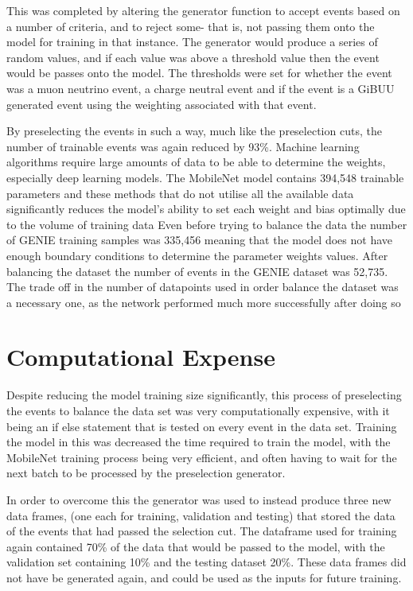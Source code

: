 \noindent This was completed by altering the generator function to accept events based on a number of criteria, and to reject some- that is, not passing them onto the model for training in that instance. The generator would produce a series of random values, and if each value was above a threshold value then the event would be passes onto the model. The thresholds were set for whether the event was a muon neutrino event, a charge neutral event and if the event is a GiBUU generated event using the weighting associated with that event.\medskip

\noindent By preselecting the events in such a way, much like the preselection cuts, the number of trainable events was again reduced by 93\%. Machine learning algorithms require large amounts of data to be able to determine the weights, especially deep learning models. The MobileNet model contains 394,548 trainable parameters and these methods that do not utilise all the available data significantly reduces the model's ability to set each weight and bias optimally due to the volume of training data Even before trying to balance the data the number of GENIE training samples was 335,456 meaning that the model does not have enough boundary conditions to determine the parameter weights values. After balancing the dataset the number of events in the GENIE dataset was 52,735. The trade off in the number of datapoints used in order balance the dataset was a necessary one, as the network performed much more successfully after doing so  \medskip


\section{Computational Expense}

\noindent Despite reducing the model training size significantly, this process of preselecting the events to balance the data set was very computationally expensive, with it being an if else statement that is tested on every event in the data set. Training the model in this was decreased the time required to train the model, with the MobileNet training process being very efficient, and often having to wait for the next batch to be processed by the preselection generator.\medskip

\noindent In order to overcome  this the generator was used to instead produce three new data frames, (one each for training, validation and testing) that stored the data of the events that had passed the selection cut. The dataframe used for training again contained 70\% of the data that would be passed to the model, with the validation set containing 10\% and the testing dataset 20\%. These data frames did not have be generated again, and could be used as the inputs for future training.\medskip

